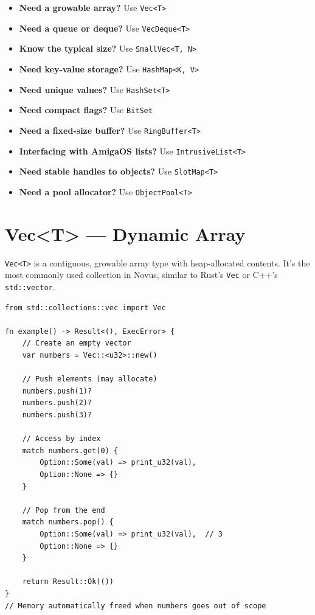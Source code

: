 \begin{itemize}
    \item \textbf{Need a growable array?} Use \texttt{Vec<T>}
    \item \textbf{Need a queue or deque?} Use \texttt{VecDeque<T>}
    \item \textbf{Know the typical size?} Use \texttt{SmallVec<T, N>}
    \item \textbf{Need key-value storage?} Use \texttt{HashMap<K, V>}
    \item \textbf{Need unique values?} Use \texttt{HashSet<T>}
    \item \textbf{Need compact flags?} Use \texttt{BitSet}
    \item \textbf{Need a fixed-size buffer?} Use \texttt{RingBuffer<T>}
    \item \textbf{Interfacing with AmigaOS lists?} Use \texttt{IntrusiveList<T>}
    \item \textbf{Need stable handles to objects?} Use \texttt{SlotMap<T>}
    \item \textbf{Need a pool allocator?} Use \texttt{ObjectPool<T>}
\end{itemize}

\section{Vec<T> --- Dynamic Array}
\label{sec:vec}

\texttt{Vec<T>} is a contiguous, growable array type with heap-allocated contents. It's the most commonly used collection in Novus, similar to Rust's \texttt{Vec} or C++'s \texttt{std::vector}.

\begin{lstlisting}
from std::collections::vec import Vec

fn example() -> Result<(), ExecError> {
    // Create an empty vector
    var numbers = Vec::<u32>::new()

    // Push elements (may allocate)
    numbers.push(1)?
    numbers.push(2)?
    numbers.push(3)?

    // Access by index
    match numbers.get(0) {
        Option::Some(val) => print_u32(val),
        Option::None => {}
    }

    // Pop from the end
    match numbers.pop() {
        Option::Some(val) => print_u32(val),  // 3
        Option::None => {}
    }

    return Result::Ok(())
}
// Memory automatically freed when numbers goes out of scope
\end{lstlisting}

